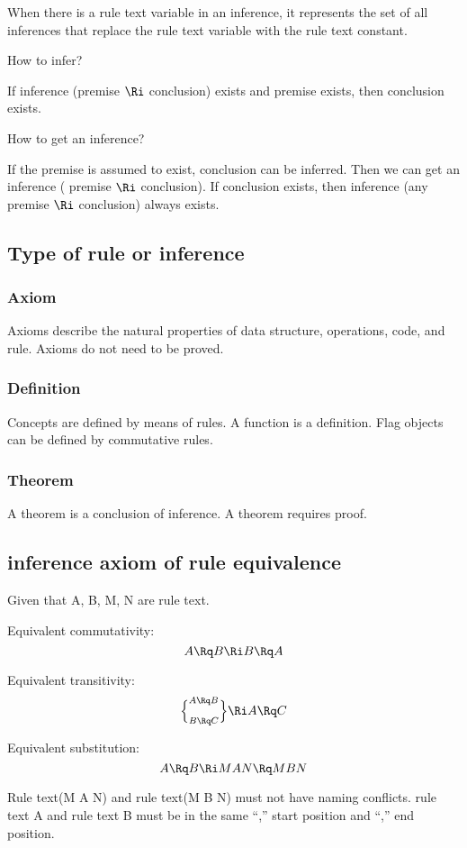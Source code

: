 When there is a rule text variable in an inference, it represents the set of all inferences that replace the rule text variable with the rule text constant.

How to infer?

If inference (premise \( \Ri \) conclusion) exists and premise exists, then conclusion exists.

How to get an inference?

If the premise is assumed to exist, conclusion can be inferred. Then we can get an inference ( premise \( \Ri \) conclusion). If conclusion exists, then inference (any premise \( \Ri \) conclusion) always exists.





\subsection{Type of rule or inference}
\subsubsection{Axiom}
Axioms describe the natural properties of data structure, operations, code, and rule. Axioms do not need to be proved.

\subsubsection{Definition}
Concepts are defined by means of rules. A function is a definition. Flag objects can be defined by commutative rules.

\subsubsection{Theorem}
A theorem is a conclusion  of inference. A theorem  requires proof. 

\subsection{inference axiom of rule equivalence}
Given that A, B, M, N are rule text.

Equivalent commutativity:
\[ A \Rq B \Ri B \Rq A\]

Equivalent transitivity:
\[\Bigl\{ ^{A \Rq B}_{B \Rq C}\Bigl\} \Ri A \Rq C\]


Equivalent substitution:
\[ A \Rq B \Ri M A N \Rq M B N\]

Rule text(M A N) and rule text(M B N)  must not have naming conflicts. rule text A and rule text B must be in the same “,” start position and “,” end position.

